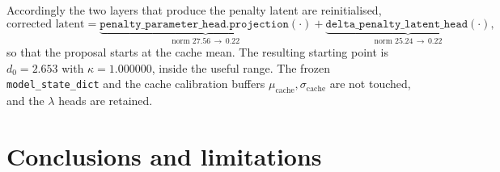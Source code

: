 \documentclass[11pt]{article}
\begin{document}
Accordingly the two layers that produce the penalty latent are reinitialised,
%
\[
\text{corrected latent}
= \underbrace{\texttt{penalty\_parameter\_head.projection}(\cdot)}
  _{\text{norm } 27.56 \,\to\, 0.22}
+ \underbrace{\texttt{delta\_penalty\_latent\_head}(\cdot)}
  _{\text{norm } 25.24 \,\to\, 0.22} ,
\]
%
so that the proposal starts at the cache mean. The resulting starting point is
$d_0 = 2.653$ with $\kappa = 1.000000$, inside the useful range. The frozen
\texttt{model\_state\_dict} and the cache calibration buffers
$\mu_{\mathrm{cache}}, \sigma_{\mathrm{cache}}$ are not touched, and the
$\lambda$ heads are retained.

\section{Conclusions and limitations}
\end{document}
